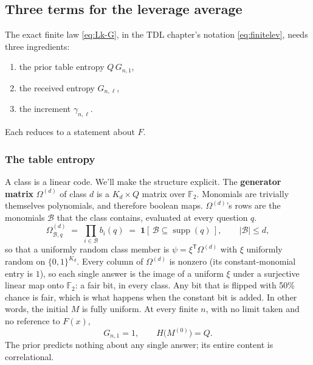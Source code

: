\documentclass[11pt]{article}
\begin{document}
\subsection{Three terms for the leverage average}

The exact finite law \eqref{eq:Lk-G}, in the TDL chapter's notation
\eqref{eq:finitelev}, needs three ingredients: 

\begin{enumerate}
  \item the prior table entropy $Q\,G_{n,1}$,
  \item the received entropy $G_{n,\ell}$,
  \item the increment $\gamma_{n,\ell}$.
\end{enumerate}
Each reduces to a statement about $F$.

\subsubsection{The table entropy}

A class is a linear code. We'll make the
structure explicit. The \textbf{generator matrix} $\Omega^{(d)}$ of class
$d$ is a $K_d \times Q$ matrix over $\mathbb F_2$. 
Monomials are trivially themselves polynomials, and therefore boolean maps.
$\Omega^{(d)}$'s rows are the monomials $\mathcal B$ that the class contains, evaluated at every question $q$.
%
\begin{equation}
  \Omega^{(d)}_{\mathcal B,q}
    \;=\; \prod_{i \in \mathcal B} b_i(q)
    \;=\; \mathbf 1[\, \mathcal B \subseteq \operatorname{supp}(q) \,],
  \qquad |\mathcal B| \le d ,
  \label{eq:genmat}
\end{equation}
%
so that a uniformly random class member is $\psi = \xi^{\mathsf T} \Omega^{(d)}$
with $\xi$ uniformly random on $\{0,1\}^{K_d}$. Every column of $\Omega^{(d)}$ is
nonzero (its constant-monomial entry is $1$), so each single answer is
the image of a uniform $\xi$ under a surjective linear map onto
$\mathbb F_2$: a fair bit, in every class. Any bit that is flipped with 50\% chance is fair, which is what happens when the constant bit is added.
In other words, the initial $M$ is fully uniform.
At every finite $n$, with no limit taken and no reference to $F(x)$,
%
\begin{equation}
  G_{n,1} = 1,
  \qquad
  H\big(M^{(0)}\big) = Q .
  \label{eq:shapeT1}
\end{equation}
%
The prior predicts nothing about any single answer; its entire
content is correlational.
\end{document}
